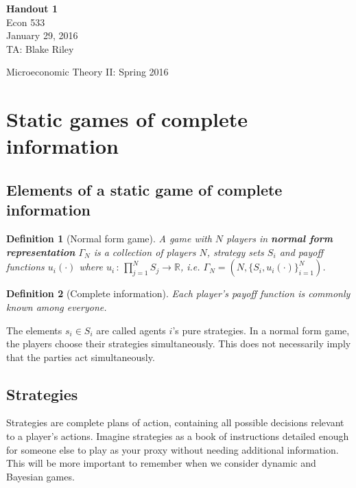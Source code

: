 \documentclass[letter, 11pt]{article}
\theoremstyle{basic}
\newtheorem{definition}{Definition}[section]
\newcommand{\R}{\mathbb{R}}
\begin{document}
\begin{spacing}{1.0}

\noindent
\textbf{Handout 1} \\
Econ 533 \\
January 29, 2016 \\
TA: Blake Riley \\

\begin{center}
{\Large Microeconomic Theory II: Spring 2016}
\end{center}

\section{Static games of complete information}

\subsection{Elements of a static game of complete
  information}

\begin{definition}[Normal form game]
  A game with $N$ players in \textbf{normal form
    representation} $\Gamma_N$ is a collection of players
    $N$, strategy sets $S_i$ and payoff functions
    $u_i(\cdot)$ where $u_i \,:\, \prod_{j=1}^N S_j \to
    \R$, i.e. $\Gamma_N = \left(N, \{S_i, u_i(\cdot)\}_{i=1}^N\right)$.
\end{definition}

\begin{definition}[Complete information]
  Each player's payoff function is commonly known among everyone.
\end{definition}

The elements $s_i \in S_i$ are called agents $i$'s pure strategies. In a
normal form game, the players choose their strategies simultaneously. This
does not necessarily imply that the parties act simultaneously.

\subsection{Strategies}

Strategies are complete plans of action, containing all possible decisions
relevant to a player's actions. Imagine strategies as a book of
instructions detailed enough for someone else to play as your proxy without
needing additional information. This will be more important to remember
when we consider dynamic and Bayesian games.


\end{spacing}
\end{document}
